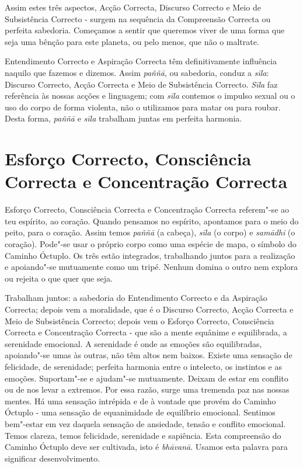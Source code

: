 Assim estes três aspectos, Acção Correcta, Discurso Correcto e Meio de Subsistência
Correcto - surgem na sequência da Compreensão Correcta ou perfeita sabedoria.
Começamos a sentir que queremos viver de uma forma que seja uma bênção para este
planeta, ou pelo menos, que não o maltrate.

Entendimento Correcto e Aspiração Correcta têm definitivamente influência
naquilo que fazemos e dizemos. Assim \emph{paññā}, ou sabedoria, conduz a
\emph{sīla}: Discurso Correcto, Acção Correcta e Meio de Subsistência Correcto.
\emph{Sīla} faz referência às nossas acções e linguagem; com \emph{sīla}
contemos o impulso sexual ou o uso do corpo de forma violenta, não o utilizamos
para matar ou para roubar. Desta forma, \emph{paññā} e \emph{sīla} trabalham
juntas em perfeita harmonia.

\section{Esforço Correcto, Consciência Correcta e Concentração Correcta}

Esforço Correcto, Consciência Correcta e Concentração Correcta referem"-se ao teu
espírito, ao coração. Quando pensamos no espírito, apontamos para o meio do
peito, para o coração. Assim temos \emph{paññā} (a cabeça), \emph{sīla} (o
corpo) e \emph{samādhi} (o coração). Pode"-se usar o próprio corpo como uma
espécie de mapa, o símbolo do Caminho Óctuplo. Os três estão integrados,
trabalhando juntos para a realização e apoiando"-se mutuamente como um tripé.
Nenhum domina o outro nem explora ou rejeita o que quer que seja.

Trabalham juntos: a sabedoria do Entendimento Correcto e da Aspiração Correcta;
depois vem a moralidade, que é o Discurso Correcto, Acção Correcta e Meio de
Subsistência Correcto; depois vem o Esforço Correcto, Consciência Correcta e Concentração
Correcta - que são a mente equânime e equilibrada, a serenidade emocional. A
serenidade é onde as emoções são equilibradas, apoiando"-se umas às outras, não
têm altos nem baixos. Existe uma sensação de felicidade, de serenidade; perfeita
harmonia entre o intelecto, os instintos e as emoções. Suportam"-se e ajudam"-se
mutuamente. Deixam de estar em conflito ou de nos levar a extremos. Por essa
razão, surge uma tremenda paz nas nossas mentes. Há uma sensação intrépida e de
à vontade que provém do Caminho Óctuplo - uma sensação de equanimidade de
equilíbrio emocional. Sentimos bem"-estar em vez daquela sensação de ansiedade,
tensão e conflito emocional. Temos clareza, temos felicidade, serenidade e sapiência.
Esta compreensão do Caminho Óctuplo deve ser cultivada, isto é \emph{bhāvanā}.
Usamos esta palavra para significar desenvolvimento.

